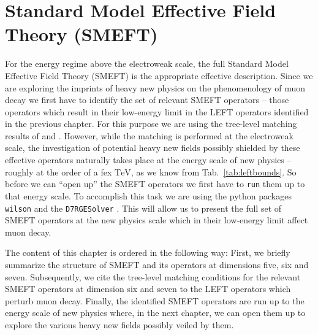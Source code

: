 \chapter{Standard Model Effective Field Theory (SMEFT)}\label{ch:smeft}
For the energy regime above the electroweak scale, the full Standard Model Effective Field Theory (SMEFT) is the appropriate effective description. Since we are exploring the imprints of heavy new physics on the phenomenology of muon decay we first have to identify the set of relevant SMEFT operators -- those operators which result in their low-energy limit in the LEFT operators identified in the previous chapter. For this purpose we are using the tree-level matching results of \cite{jenkins2018lowOM} and \parencite{liao2020extending}. However, while the matching is performed at the electroweak scale, the investigation of potential heavy new fields possibly shielded by these effective operators naturally takes place at the energy scale of new physics -- roughly at the order of a fex $\text{TeV}$, as we know from Tab.~\ref{tab:leftbounds}. So before we can \enquote{open up} the SMEFT operators we first have to \texttt{run} them up to that energy scale. To accomplish this task we are using the python packages \texttt{wilson} \cite{aebischer2018python} and the \texttt{D7RGESolver} \parencite{liao2025rge}. This will allow us to present the full set of SMEFT operators at the new physics scale which in their low-energy limit affect muon decay.\par
The content of this chapter is ordered in the following way: First, we briefly summarize the structure of SMEFT and its operators at dimensions five, six and seven. Subsequently, we cite the tree-level matching conditions for the relevant SMEFT operators at dimension six and seven to the LEFT operators which perturb muon decay. Finally, the identified SMEFT operators are run up to the energy scale of new physics where, in the next chapter, we can open them up to explore the various heavy new fields possibly veiled by them.
